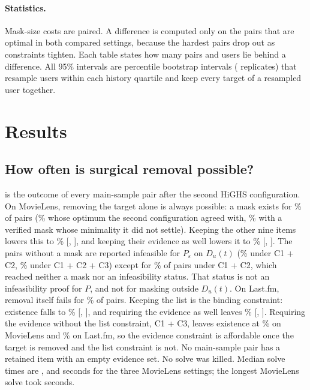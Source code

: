 \documentclass[11pt]{article}
\begin{document}
\paragraph{Statistics.} Mask-size costs are paired. A difference is computed only on the pairs that are optimal in both
compared settings, because the hardest pairs drop out as constraints tighten. Each table states how many pairs and
users lie behind a difference. All 95\% intervals are percentile bootstrap intervals (\NBoot{} replicates) that
resample users within each history quartile and keep every target of a resampled user together.

\section{Results}
\label{sec:results}

\subsection{How often is surgical removal possible?}

\begin{table}[t]
\centering
\caption{Solver outcomes after the second HiGHS configuration (\%). Each row is \NPairs{} pairs from \NUsers{} users, $K=10$, $\alpha=0.5$,
$\varepsilon=\Eps$. A mask exists when the outcome is optimal or feasible. The feasible share on MovieLens includes
the \MLCertUndecided{} claimed optima that the second HiGHS configuration did not confirm. The interval resamples users.}
\label{tab:status}
\resizebox{\linewidth}{!}{}
\end{table}

 is the outcome of every main-sample pair after the second HiGHS configuration. On MovieLens, removing the target alone is
always possible: a mask exists for \MLAExists\% of pairs (\MLAOpt\% whose optimum the second configuration
agreed with, \MLAFeas\% with a verified mask whose minimality it did not settle). Keeping the other nine items
lowers this to \MLBExists\% [\MLBExistsLo, \MLBExistsHi], and keeping their evidence as well lowers it to
\MLCExists\% [\MLCExistsLo, \MLCExistsHi]. The pairs without a mask are reported infeasible for $P_\varepsilon$ on
$D_u(t)$ (\MLBInf\% under C1 + C2, \MLCInf\% under C1 + C2 + C3) except for \MLBTout\% of pairs under C1 + C2,
which reached neither a mask nor an infeasibility status. That status is not an infeasibility proof for $P$, and
not for masking outside $D_u(t)$. On Last.fm,
removal itself fails for \LFAInf\% of pairs. Keeping the list is the binding constraint: existence falls to
\LFBExists\% [\LFBExistsLo, \LFBExistsHi], and requiring the evidence as well leaves \LFCExists\% [\LFCExistsLo,
\LFCExistsHi]. Requiring the evidence without the list constraint, C1 + C3, leaves existence at \MLAThreeExists\% on
MovieLens and \LFAThreeExists\% on Last.fm, so the evidence constraint is affordable once the target is removed and the
list constraint is not. No main-sample pair has a retained item with an empty evidence set. No solve was killed.
Median solve times are \MLATime, \MLBTime{} and \MLCTime{} seconds for the three MovieLens settings; the longest
MovieLens solve took \MLATimeMax{} seconds.
\end{document}
